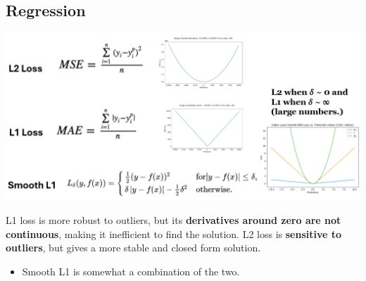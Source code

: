 \documentclass[10pt]{article}
\begin{document}
\subsection*{Regression}
\begin{center} 
	\includegraphics*[width=\textwidth]{L2_24.png} 
\end{center}
L1 loss is more robust to outliers, but its \textbf{derivatives around zero are not continuous}, making it inefficient to find the solution.  L2 loss is \textbf{sensitive to outliers}, but gives a more stable and closed form solution.
\begin{itemize}
	\item Smooth L1 is somewhat a combination of the two.
\end{itemize}
\end{document}
